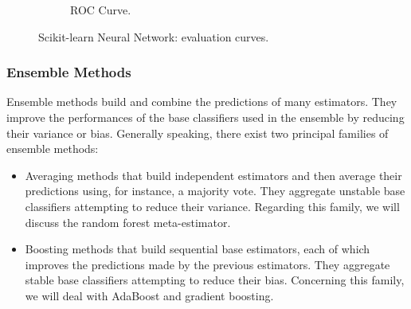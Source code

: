 \documentclass[10pt, a4paper, twocolumn]{article}
\begin{document}
\begin{figure}[h]
\begin{subfigure}[t]{0.55\columnwidth}
    \caption{ROC Curve.}
    \label{fig:nnroc}
    \end{subfigure}
\caption{Scikit-learn Neural Network: evaluation curves.}
\label{fig:nneval}
\end{figure}


\subsubsection*{Ensemble Methods}

Ensemble methods build and combine the predictions of many estimators. They improve the performances of the base classifiers used in the ensemble by reducing their variance or bias. Generally speaking, there exist two principal families of ensemble methods:
%
\begin{itemize}
    \item Averaging methods that build independent estimators and then average their predictions using, for instance, a majority vote. They aggregate unstable base classifiers attempting to reduce their variance. Regarding this family, we will discuss the random forest meta-estimator.
    \item Boosting methods that build sequential base estimators, each of which improves the predictions made by the previous estimators. They aggregate stable base classifiers attempting to reduce their bias. Concerning this family, we will deal with AdaBoost and gradient boosting.
\end{itemize}

\begin{table}[h]
\centering
\caption{Classification report for Random Forest}
\label{tab:rf_report}    
\end{table}
\end{document}
